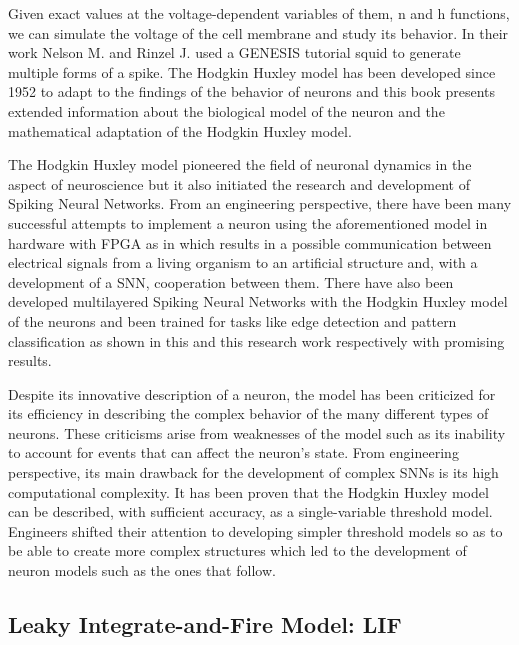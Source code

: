 \documentclass[12pt]{report}
\begin{document}
Given exact values at the voltage-dependent variables of them, n and h functions, we can simulate the voltage of the cell membrane and study its behavior. In their work \cite{NelsonM} Nelson M. and Rinzel J. used a GENESIS tutorial squid \cite{squid} to generate multiple forms of a spike. The Hodgkin Huxley model has been developed since 1952 to adapt to the findings of the behavior of neurons and this book \cite{gerstner2014} presents extended information about the biological model of the neuron and the mathematical adaptation of the Hodgkin Huxley model.

The Hodgkin Huxley model pioneered the field of neuronal dynamics in the aspect of neuroscience but it also initiated the research and development of Spiking Neural Networks. From an engineering perspective, there have been many successful attempts to implement a neuron using the aforementioned model in hardware with FPGA as in \cite{Levi2018} which results in a possible communication between electrical signals from a living organism to an artificial structure and, with a development of a SNN, cooperation between them. There have also been developed multilayered Spiking Neural Networks with the Hodgkin Huxley model of the neurons and been trained for tasks like edge detection and pattern classification as shown in this \cite{Yedjour2017} and this \cite{pattern2016} research work respectively with promising results.

Despite its innovative description of a neuron, the model has been criticized for its efficiency in describing the complex behavior of the many different types of neurons. These criticisms arise from weaknesses of the model such as its inability to account for events that can affect the neuron's state\cite{limit1993}. From engineering perspective, its main drawback for the development of complex SNNs is its high computational complexity. It has been proven \cite{reduction1997} that the Hodgkin Huxley model can be described, with sufficient accuracy, as a single-variable threshold model. Engineers shifted their attention to developing simpler threshold models so as to be able to create more complex structures which led to the development of neuron models such as the ones that follow.

\medskip

\subsection{Leaky Integrate-and-Fire Model: LIF}
\end{document}
